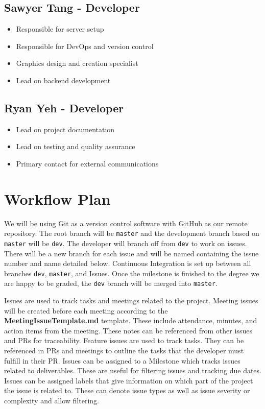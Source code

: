 \documentclass{article}
\def\code#1{\texttt{#1}}
\begin{document}
    \subsection{Sawyer Tang - Developer}
        \begin{itemize}
            \item Responsible for server setup
            \item Responsible for DevOps and version control
            \item Graphics design and creation specialist
            \item Lead on backend development
        \end{itemize}
    \subsection{Ryan Yeh - Developer}
        \begin{itemize}
            \item Lead on project documentation
            \item Lead on testing and quality assurance
            \item Primary contact for external communications
        \end{itemize}

\section{Workflow Plan}

We will be using Git as a version control software with GitHub as our remote repository. The root branch will be \code{master} and the development branch based on \code{master} will be \code{dev}. The developer will branch off from \code{dev} to work on issues. There will be a new branch for each issue and will be named containing the issue number and name detailed below. Continuous Integration is set up between all branches \code{dev}, \code{master}, and Issues. Once the milestone is finished to the degree we are happy to be graded, the \code{dev} branch will be merged into \code{master}.

Issues are used to track tasks and meetings related to the project. Meeting issues will be created before each meeting according to the \textbf{MeetingIssueTemplate.md} template. These include attendance, minutes, and action items from the meeting. These notes can be referenced from other issues and PRs for traceability.
Feature issues are used to track tasks. They can be referenced in PRs and meetings to outline the tasks that the developer must fulfill in their PR.
Issues can be assigned to a Milestone which tracks issues related to deliverables. These are useful for filtering issues and tracking due dates.
Issues can be assigned labels that give information on which part of the project the issue is related to. These can denote issue types as well as issue severity or complexity and allow filtering.
\end{document}
